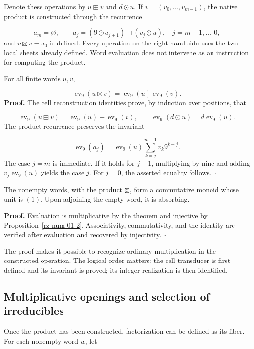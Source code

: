 Denote these operations by $u\boxplus v$ and $d\odot u$. If $v=(v_0,\ldots,v_{m-1})$, the native product is constructed through the recurrence

\[
a_m=\varnothing,\qquad
a_j=(9\odot a_{j+1})\boxplus(v_j\odot u),
\quad j=m-1,\ldots,0,
\]
and $u\boxtimes v=a_0$ is defined. Every operation on the right-hand side uses the two local sheets already defined. Word evaluation does not intervene as an instruction for computing the product.

For all finite words $u,v$,

\[
\operatorname{ev}_9(u\boxtimes v)
=\operatorname{ev}_9(u)\operatorname{ev}_9(v).
\]
\textbf{Proof.} The cell reconstruction identities prove, by induction over positions, that

\[
\operatorname{ev}_9(u\boxplus v)
=\operatorname{ev}_9(u)+\operatorname{ev}_9(v),\qquad
\operatorname{ev}_9(d\odot u)=d\operatorname{ev}_9(u).
\]
The product recurrence preserves the invariant

\[
\operatorname{ev}_9(a_j)
=\operatorname{ev}_9(u)\sum_{k=j}^{m-1}v_k9^{k-j}.
\]
The case $j=m$ is immediate. If it holds for $j+1$, multiplying by nine and adding $v_j\operatorname{ev}_9(u)$ yields the case $j$. For $j=0$, the asserted equality follows. \hfill\(\square\)

The nonempty words, with the product $\boxtimes$, form a commutative monoid whose unit is $(1)$. Upon adjoining the empty word, it is absorbing.

\textbf{Proof.} Evaluation is multiplicative by the theorem and injective by Proposition~\ref{rz-num-01-2}. Associativity, commutativity, and the identity are verified after evaluation and recovered by injectivity. \hfill\(\square\)

The proof makes it possible to recognize ordinary multiplication in the constructed operation. The logical order matters: the cell transducer is first defined and its invariant is proved; its integer realization is then identified.

\subsection{Multiplicative openings and selection of irreducibles}
Once the product has been constructed, factorization can be defined as its fiber. For each nonempty word $w$, let

